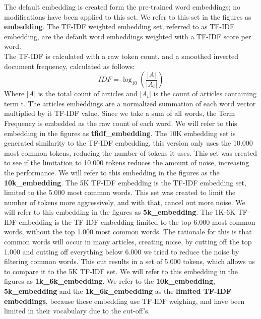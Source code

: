 \documentclass[../../Thesis.tex]{subfiles}
\begin{document}
The default embedding is created form the pre-trained word embeddings; no modifications have been applied to this set. We refer to this set in the figures as \textbf{embedding}.
The TF-IDF weighted embedding set, referred to as TF-IDF embedding, are the default word embeddings weighted with a TF-IDF score per word.\\
The TF-IDF is calculated with a raw token count, and a smoothed inverted document frequency, calculated as follows:\\
\begin{equation}
IDF = \log_{10}(\dfrac{|A|}{|A_t|})
\end{equation}
Where $|A|$ is the total count of articles and $|A_t|$ is the count of articles containing term t.
The articles embeddings are a normalized summation of each word vector multiplied by it TF-IDF value. Since we take a sum of all words, the Term Frequency is embedded as the raw count of each word. We will refer to this embedding in the figures as \textbf{tfidf\_embedding}.
The 10K embedding set is generated similarity to the TF-IDF embedding, this version only uses the 10.000 most common tokens, reducing the number of tokens it uses. This set was created to see if the limitation to 10.000 tokens reduces the amount of noise, increasing the performance. We will refer to this embedding in the figures as the \textbf{10k\_embedding}.
The 5K TF-IDF embedding is the TF-IDF embedding set, limited to the 5.000 most common words. This set was created to limit the number of tokens more aggressively, and with that, cancel out more noise. We will refer to this embedding in the figures as \textbf{5k\_embedding}.
The 1K-6K TF-IDF embedding is the TF-IDF embedding limited to the top 6.000 most common words, without the top 1.000 most common words. The rationale for this is that common words will occur in many articles, creating noise, by cutting off the top 1.000 and cutting off everything below 6.000 we tried to reduce the noise by filtering common words. This cut results in a set of 5.000 tokens, which allows us to compare it to the 5K TF-IDF set. We will refer to this embedding in the figures as \textbf{1k\_6k\_embedding}. We refer to the \textbf{10k\_embedding}, \textbf{5k\_embedding} and the \textbf{1k\_6k\_embedding} as the \textbf{limited TF-IDF embeddings}, because these embedding use TF-IDF weighing, and have been limited in their vocabulary due to the cut-off's.
\end{document}
